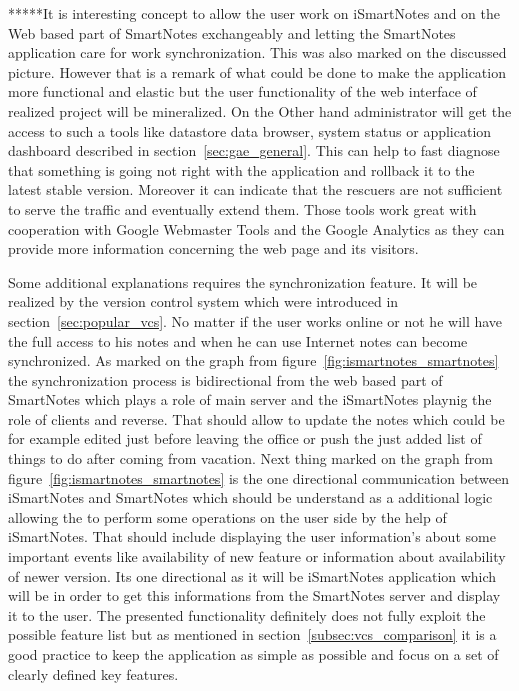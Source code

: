 *****It is interesting concept to allow the user work on iSmartNotes and on the Web based part of SmartNotes exchangeably  and letting the SmartNotes application care for work synchronization. This was also marked on the discussed picture. However that is a remark of what could be done to make the application more functional and elastic but the user functionality of the web interface of realized project will be mineralized. On the Other hand administrator will get the access to such a tools like datastore data browser, system status or application dashboard described in section~\ref{sec:gae_general}. This can help to fast diagnose that something is going not right with the application and rollback it to the latest stable version. Moreover  it can indicate that the rescuers are not sufficient to serve the traffic and eventually extend them. Those tools work great with cooperation with Google Webmaster Tools and the Google Analytics as they can provide more information concerning the web page and its visitors.

Some additional explanations requires the synchronization feature. It will be realized by the version control system which were introduced in section~\ref{sec:popular_vcs}. No matter if the user works online or not he will have the full access to his notes and when he can use Internet notes can become synchronized. As marked on the graph from figure~\ref{fig:ismartnotes_smartnotes} the synchronization process is bidirectional from the web based part of SmartNotes which plays a role of main server and the iSmartNotes playnig the role of clients and reverse. That should allow to update the notes which could be for example edited just before leaving the office or push the just added list of things to do after coming from vacation. Next thing marked on the graph from figure~\ref{fig:ismartnotes_smartnotes} is the one directional communication between iSmartNotes and SmartNotes which should be understand as a additional logic allowing the to perform some operations on the user side by the help of iSmartNotes. That should include displaying the user information's about some important events like availability of new feature or information about availability of newer version.  Its one directional as it will be iSmartNotes application which will be in order to get this informations from the SmartNotes server and display it to the user. The presented functionality definitely does not fully exploit the possible feature list but as mentioned in section~\ref{subsec:vcs_comparison} it is a good practice to keep the application as simple as possible and focus on a set of clearly defined key features.

